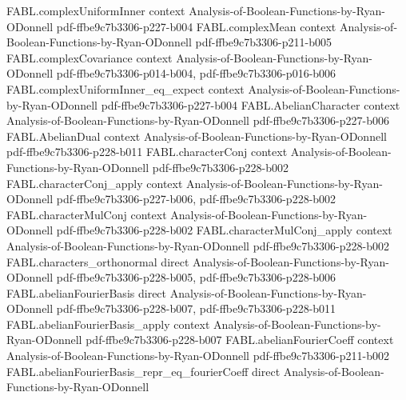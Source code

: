 \begin{theorem}
\label{FABL.complexCovariance_eq_sum_fourierCoeff}
\leanok
{}
\proofstep
  {FABL.complexUniformInner}
  {context}
  {Analysis-of-Boolean-Functions-by-Ryan-ODonnell}
  {pdf-ffbe9c7b3306-p227-b004}
\proofstep
  {FABL.complexMean}
  {context}
  {Analysis-of-Boolean-Functions-by-Ryan-ODonnell}
  {pdf-ffbe9c7b3306-p211-b005}
\proofstep
  {FABL.complexCovariance}
  {context}
  {Analysis-of-Boolean-Functions-by-Ryan-ODonnell}
  {pdf-ffbe9c7b3306-p014-b004,
    pdf-ffbe9c7b3306-p016-b006}
\proofstep
  {FABL.complexUniformInner_eq_expect}
  {context}
  {Analysis-of-Boolean-Functions-by-Ryan-ODonnell}
  {pdf-ffbe9c7b3306-p227-b004}
\proofstep
  {FABL.AbelianCharacter}
  {context}
  {Analysis-of-Boolean-Functions-by-Ryan-ODonnell}
  {pdf-ffbe9c7b3306-p227-b006}
\proofstep
  {FABL.AbelianDual}
  {context}
  {Analysis-of-Boolean-Functions-by-Ryan-ODonnell}
  {pdf-ffbe9c7b3306-p228-b011}
\proofstep
  {FABL.characterConj}
  {context}
  {Analysis-of-Boolean-Functions-by-Ryan-ODonnell}
  {pdf-ffbe9c7b3306-p228-b002}
\proofstep
  {FABL.characterConj_apply}
  {context}
  {Analysis-of-Boolean-Functions-by-Ryan-ODonnell}
  {pdf-ffbe9c7b3306-p227-b006,
    pdf-ffbe9c7b3306-p228-b002}
\proofstep
  {FABL.characterMulConj}
  {context}
  {Analysis-of-Boolean-Functions-by-Ryan-ODonnell}
  {pdf-ffbe9c7b3306-p228-b002}
\proofstep
  {FABL.characterMulConj_apply}
  {context}
  {Analysis-of-Boolean-Functions-by-Ryan-ODonnell}
  {pdf-ffbe9c7b3306-p228-b002}
\proofstep
  {FABL.characters_orthonormal}
  {direct}
  {Analysis-of-Boolean-Functions-by-Ryan-ODonnell}
  {pdf-ffbe9c7b3306-p228-b005,
    pdf-ffbe9c7b3306-p228-b006}
\proofstep
  {FABL.abelianFourierBasis}
  {direct}
  {Analysis-of-Boolean-Functions-by-Ryan-ODonnell}
  {pdf-ffbe9c7b3306-p228-b007,
    pdf-ffbe9c7b3306-p228-b011}
\proofstep
  {FABL.abelianFourierBasis_apply}
  {context}
  {Analysis-of-Boolean-Functions-by-Ryan-ODonnell}
  {pdf-ffbe9c7b3306-p228-b007}
\proofstep
  {FABL.abelianFourierCoeff}
  {context}
  {Analysis-of-Boolean-Functions-by-Ryan-ODonnell}
  {pdf-ffbe9c7b3306-p211-b002}
\proofstep
  {FABL.abelianFourierBasis_repr_eq_fourierCoeff}
  {direct}
  {Analysis-of-Boolean-Functions-by-Ryan-ODonnell}

\end{theorem}
